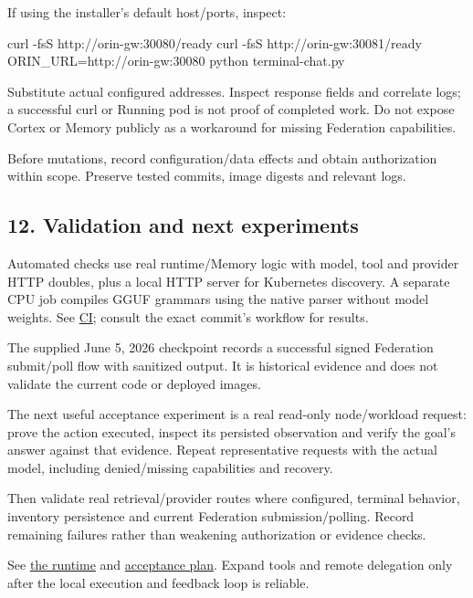 \documentclass[
  10pt,
]{article}
\newenvironment{Shaded}{}{}
\newcommand{\AttributeTok}[1]{\textcolor[rgb]{0.49,0.56,0.16}{#1}}
\newcommand{\ExtensionTok}[1]{#1}
\newcommand{\NormalTok}[1]{#1}
\newcommand{\OperatorTok}[1]{\textcolor[rgb]{0.40,0.40,0.40}{#1}}
\newcommand{\VariableTok}[1]{\textcolor[rgb]{0.10,0.09,0.49}{#1}}
\begin{document}
If using the installer's default host/ports, inspect:

\begin{Shaded}
\begin{Highlighting}[]
\ExtensionTok{curl} \AttributeTok{{-}fsS}\NormalTok{ http://orin{-}gw:30080/ready}
\ExtensionTok{curl} \AttributeTok{{-}fsS}\NormalTok{ http://orin{-}gw:30081/ready}
\VariableTok{ORIN\_URL}\OperatorTok{=}\NormalTok{http://orin{-}gw:30080 }\ExtensionTok{python}\NormalTok{ terminal{-}chat.py}
\end{Highlighting}
\end{Shaded}

Substitute actual configured addresses. Inspect response fields and
correlate logs; a successful curl or Running pod is not proof of
completed work. Do not expose Cortex or Memory publicly as a workaround
for missing Federation capabilities.

Before mutations, record configuration/data effects and obtain
authorization within scope. Preserve tested commits, image digests and
relevant logs.

\hypertarget{validation-and-next-experiments}{%
\subsection{12. Validation and next
experiments}\label{validation-and-next-experiments}}

Automated checks use real runtime/Memory logic with model, tool and
provider HTTP doubles, plus a local HTTP server for Kubernetes
discovery. A separate CPU job compiles GGUF grammars using the native
parser without model weights. See
\href{https://github.com/ILGSupreme/Orin/blob/main/docs/ci.md}{CI};
consult the exact commit's workflow for results.

The supplied June 5, 2026 checkpoint records a successful signed
Federation submit/poll flow with sanitized output. It is historical
evidence and does not validate the current code or deployed images.

The next useful acceptance experiment is a real read-only node/workload
request: prove the action executed, inspect its persisted observation
and verify the goal's answer against that evidence. Repeat
representative requests with the actual model, including denied/missing
capabilities and recovery.

Then validate real retrieval/provider routes where configured, terminal
behavior, inventory persistence and current Federation
submission/polling. Record remaining failures rather than weakening
authorization or evidence checks.

See
\href{https://github.com/ILGSupreme/Orin/blob/main/docs/cortex-agent.md}{the
runtime} and
\href{https://github.com/ILGSupreme/Orin/blob/main/docs/unified-agent-action-plan.md}{acceptance
plan}. Expand tools and remote delegation only after the local execution
and feedback loop is reliable.
\end{document}
